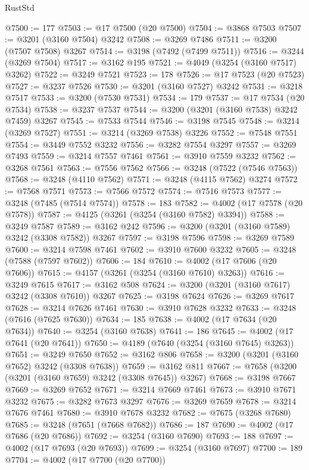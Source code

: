 \begin{lexlean}{RustStd}
\begin{coremodule}
@7500 := 177
@7503 := @17 @7500 (@20 @7500)
@7504 := @3868 @7503
@7507 := @3201 (@3160 @7504) @3242
@7508 := @3269 @7486
@7511 := @3200 (@7507 @7508) @3267
@7514 := @3198 (@7492 (@7499 @7511))
@7516 := @3244 (@3269 @7504)
@7517 := @3162 @195
@7521 := @4049 (@3254 (@3160 @7517) @3262)
@7522 := @3249 @7521
@7523 := 178
@7526 := @17 @7523 (@20 @7523)
@7527 := @3237 @7526
@7530 := @3201 (@3160 @7527) @3242
@7531 := @3218 @7517
@7533 := @3200 (@7530 @7531)
@7534 := 179
@7537 := @17 @7534 (@20 @7534)
@7538 := @3237 @7537
@7544 := @3200 (@3201 (@3160 @7538) @3242 @7459) @3267
@7545 := @7533 @7544
@7546 := @3198 @7545
@7548 := @3214 (@3269 @7527)
@7551 := @3214 (@3269 @7538) @3226
@7552 := @7548 @7551
@7554 := @3449 @7552 @3232
@7556 := @3282 @7554 @3297
@7557 := @3269 @7493
@7559 := @3214 @7557 @7461
@7561 := @3910 @7559 @3232
@7562 := @3268 @7561
@7563 := @7556 @7562
@7566 := @3248 (@7522 (@7546 @7563))
@7568 := @3248 (@4110 @7562)
@7571 := @3248 (@4115 @7562) @3274
@7572 := @7568 @7571
@7573 := @7566 @7572
@7574 := @7516 @7573
@7577 := @3248 (@7485 (@7514 @7574))
@7578 := 183
@7582 := @4002 (@17 @7578 (@20 @7578))
@7587 := @4125 (@3261 (@3254 (@3160 @7582) @3394))
@7588 := @3249 @7587
@7589 := @3162 @242
@7596 := @3200 (@3201 (@3160 @7589) @3242 (@3308 @7582)) @3267
@7597 := @3198 @7596
@7598 := @3269 @7589
@7600 := @3214 @7598 @7461
@7602 := @3910 @7600 @3232
@7605 := @3248 (@7588 (@7597 @7602))
@7606 := 184
@7610 := @4002 (@17 @7606 (@20 @7606))
@7615 := @4157 (@3261 (@3254 (@3160 @7610) @3263))
@7616 := @3249 @7615
@7617 := @3162 @508
@7624 := @3200 (@3201 (@3160 @7617) @3242 (@3308 @7610)) @3267
@7625 := @3198 @7624
@7626 := @3269 @7617
@7628 := @3214 @7626 @7461
@7630 := @3910 @7628 @3232
@7633 := @3248 (@7616 (@7625 @7630))
@7634 := 185
@7638 := @4002 (@17 @7634 (@20 @7634))
@7640 := @3254 (@3160 @7638)
@7641 := 186
@7645 := @4002 (@17 @7641 (@20 @7641))
@7650 := @4189 (@7640 (@3254 (@3160 @7645) @3263))
@7651 := @3249 @7650
@7652 := @3162 @806
@7658 := @3200 (@3201 (@3160 @7652) @3242 (@3308 @7638))
@7659 := @3162 @811
@7667 := @7658 (@3200 (@3201 (@3160 @7659) @3242 (@3308 @7645)) @3267)
@7668 := @3198 @7667
@7669 := @3269 @7652
@7671 := @3214 @7669 @7461
@7673 := @3910 @7671 @3232
@7675 := @3282 @7673 @3297
@7676 := @3269 @7659
@7678 := @3214 @7676 @7461
@7680 := @3910 @7678 @3232
@7682 := @7675 (@3268 @7680)
@7685 := @3248 (@7651 (@7668 @7682))
@7686 := 187
@7690 := @4002 (@17 @7686 (@20 @7686))
@7692 := @3254 (@3160 @7690)
@7693 := 188
@7697 := @4002 (@17 @7693 (@20 @7693))
@7699 := @3254 (@3160 @7697)
@7700 := 189
@7704 := @4002 (@17 @7700 (@20 @7700))

\end{coremodule}
\end{lexlean}
